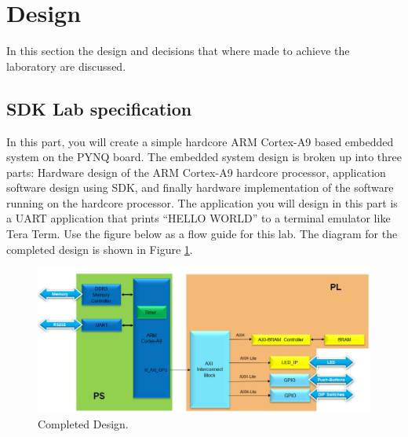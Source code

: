 \section{Design}\label{sec: Design}
In this section the design and decisions that where made to achieve the laboratory are discussed.
\subsection{SDK Lab specification}\label{subsec: Vending machine specification}
In this part, you will create a simple hardcore ARM Cortex-A9 based embedded system on the PYNQ board. The
embedded system design is broken up into three parts: Hardware design of the ARM Cortex-A9 hardcore
processor, application software design using SDK, and finally hardware implementation of the software running
on the hardcore processor. The application you will design in this part is a UART application that prints “HELLO
WORLD” to a terminal emulator like Tera Term. Use the figure below as a flow guide for this lab. The diagram
for the completed design is shown in Figure \ref{fig: Vivado_lab4_CompletedDesign}. 
\begin{figure}[H]
	\centering
	\includegraphics[width=1.0\textwidth]{01_images/Vivado_lab4_CompletedDesign.PNG}
	\caption{Completed Design.}
	\label{fig: Vivado_lab4_CompletedDesign}
\end{figure}

